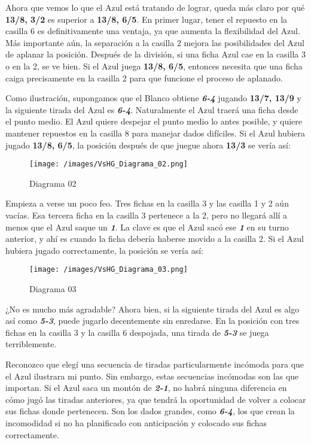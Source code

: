 \documentclass[
]{article}
\begin{document}
Ahora que vemos lo que el Azul está tratando de lograr, queda más claro
por qué \textbf{13/8, 3/2} es superior a \textbf{13/8, 6/5}. En primer
lugar, tener el repuesto en la casilla 6 es definitivamente una ventaja,
ya que aumenta la flexibilidad del Azul. Más importante aún, la
separación a la casilla 2 mejora las posibilidades del Azul de aplanar
la posición. Después de la división, si una ficha Azul cae en la casilla
3 o en la 2, se ve bien. Si el Azul juega \textbf{13/8, 6/5}, entonces
necesita que una ficha caiga precisamente en la casilla 2 para que
funcione el proceso de aplanado.

Como ilustración, supongamos que el Blanco obtiene \textbf{\emph{6-4}}
jugando \textbf{13/7, 13/9} y la siguiente tirada del Azul es
\textbf{\emph{6-4}}. Naturalmente el Azul traerá una ficha desde el
punto medio. El Azul quiere despejar el punto medio lo antes posible, y
quiere mantener repuestos en la casilla 8 para manejar dados difíciles.
Si el Azul hubiera jugado \textbf{13/8, 6/5}, la posición después de que
juegue ahora \textbf{13/3} se vería así:

\begin{figure}
\centering
\texttt{[image: /images/VsHG\_Diagrama\_02.png]}
\caption{Diagrama 02}
\end{figure}

Empieza a verse un poco feo. Tres fichas en la casilla 3 y las casilla 1
y 2 aún vacías. Esa tercera ficha en la casilla 3 pertenece a la 2, pero
no llegará allí a menos que el Azul saque un \textbf{\emph{1}}. La clave
es que el Azul sacó ese \textbf{\emph{1}} en su turno anterior, y ahí es
cuando la ficha debería haberse movido a la casilla 2. Si el Azul
hubiera jugado correctamente, la posición se vería así:

\begin{figure}
\centering
\texttt{[image: /images/VsHG\_Diagrama\_03.png]}
\caption{Diagrama 03}
\end{figure}

¿No es mucho más agradable? Ahora bien, si la siguiente tirada del Azul
es algo así como \textbf{\emph{5-3}}, puede jugarlo decentemente sin
enredarse. En la posición con tres fichas en la casilla 3 y la casilla 6
despojada, una tirada de \textbf{\emph{5-3}} se juega terriblemente.

Reconozco que elegí una secuencia de tiradas particularmente incómoda
para que el Azul ilustrara mi punto. Sin embargo, estas secuencias
incómodas son las que importan. Si el Azul saca un montón de
\textbf{\emph{2-1}}, no habrá ninguna diferencia en cómo jugó las
tiradas anteriores, ya que tendrá la oportunidad de volver a colocar sus
fichas donde pertenecen. Son los dados grandes, como
\textbf{\emph{6-4}}, los que crean la incomodidad si no ha planificado
con anticipación y colocado sus fichas correctamente.
\end{document}
